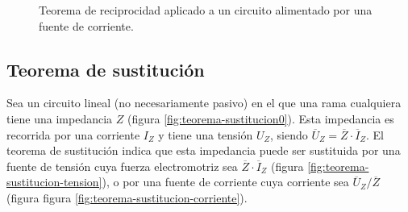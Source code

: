 \begin{figure}[H]
  \centering
  \hspace{2cm}
  \caption{Teorema de reciprocidad aplicado a un circuito alimentado por una fuente de corriente.}
  \label{fig:teorema-reciprocidad-corriente}
\end{figure}

\subsection{Teorema de sustitución}
\label{sec:teorema-sustitucion}

Sea un circuito lineal (no necesariamente pasivo) en el que una rama cualquiera tiene una impedancia $Z$ (figura \ref{fig:teorema-sustitucion0}). Esta impedancia es recorrida por una corriente $I_Z$ y tiene una tensión $U_Z$, siendo $\overline{U}_Z = \overline{Z} \cdot \overline{I}_Z$. El teorema de sustitución indica que esta impedancia puede ser sustituida por una fuente de tensión cuya fuerza electromotriz sea $\overline{Z} \cdot \overline{I}_Z$ (figura \ref{fig:teorema-sustitucion-tension}), o por una fuente de corriente cuya corriente sea $\overline{U}_Z / \overline{Z}$ (figura figura \ref{fig:teorema-sustitucion-corriente}).


